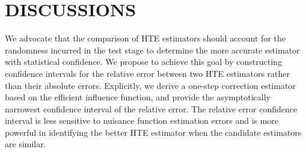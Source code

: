 \documentclass[twoside]{article}
\newcommand{\1}{{\mathbbm{1}}}
\begin{document}
\vspace{-0.5cm}

\section{DISCUSSIONS}\label{sec:discussion}

We advocate that the comparison of HTE estimators should account for the randomness incurred in the test stage to determine the more accurate estimator with statistical confidence. 
We propose to achieve this goal by constructing confidence intervals for the relative error between two HTE estimators rather than their absolute errors.
Explicitly, we derive a one-step correction estimator based on the efficient influence function, and provide the asymptotically narrowest confidence interval of the relative error.
The relative error confidence interval is less sensitive to nuisance function estimation errors and is more powerful in identifying the better HTE estimator when the candidate estimators are similar.
\end{document}
